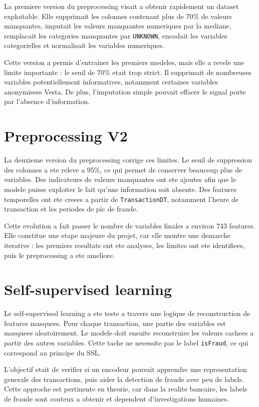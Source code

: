 ﻿\documentclass[12pt,a4paper,oneside]{report}
\begin{document}
La premiere version du preprocessing visait a obtenir rapidement un dataset exploitable. Elle supprimait les colonnes contenant plus de 70\% de valeurs manquantes, imputait les valeurs manquantes numeriques par la mediane, remplacait les categories manquantes par \texttt{UNKNOWN}, encodait les variables categorielles et normalisait les variables numeriques.

Cette version a permis d'entrainer les premiers modeles, mais elle a revele une limite importante : le seuil de 70\% etait trop strict. Il supprimait de nombreuses variables potentiellement informatives, notamment certaines variables anonymisees Vesta. De plus, l'imputation simple pouvait effacer le signal porte par l'absence d'information.

\section{Preprocessing V2}

La deuxieme version du preprocessing corrige ces limites. Le seuil de suppression des colonnes a ete releve a 95\%, ce qui permet de conserver beaucoup plus de variables. Des indicateurs de valeurs manquantes ont ete ajoutes afin que le modele puisse exploiter le fait qu'une information soit absente. Des features temporelles ont ete creees a partir de \texttt{TransactionDT}, notamment l'heure de transaction et les periodes de pic de fraude.

Cette evolution a fait passer le nombre de variables finales a environ 743 features. Elle constitue une etape majeure du projet, car elle montre une demarche iterative : les premiers resultats ont ete analyses, les limites ont ete identifiees, puis le preprocessing a ete ameliore.

\section{Self-supervised learning}

Le self-supervised learning a ete teste a travers une logique de reconstruction de features masquees. Pour chaque transaction, une partie des variables est masquees aleatoirement. Le modele doit ensuite reconstruire les valeurs cachees a partir des autres variables. Cette tache ne necessite pas le label \texttt{isFraud}, ce qui correspond au principe du SSL.

L'objectif etait de verifier si un encodeur pouvait apprendre une representation generale des transactions, puis aider la detection de fraude avec peu de labels. Cette approche est pertinente en theorie, car dans la realite bancaire, les labels de fraude sont couteux a obtenir et dependent d'investigations humaines.
\end{document}
